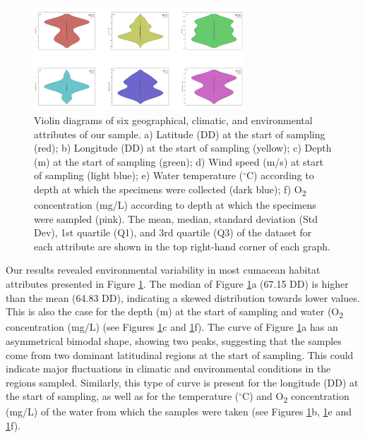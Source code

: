 \begin{figure}[htbp]
    \centering
    \includegraphics[width=0.7\textwidth]{figure1.jpg}
    \caption{Violin diagrams of six geographical, climatic, and environmental attributes of our sample. a) Latitude (DD) at the start of sampling (red); b) Longitude (DD) at the start of sampling (yellow); c) Depth (m) at the start of sampling (green); d) Wind speed (m/s) at start of sampling (light blue); e) Water temperature ($^\circ$C) according to depth at which the specimens were collected (dark blue); f) O\textsubscript{2} concentration (mg/L) according to depth at which the specimens were sampled (pink). The mean, median, standard deviation (Std Dev), 1st quartile (Q1), and 3rd quartile (Q3) of the dataset for each attribute are shown in the top right-hand corner of each graph. \label{fig:fig1}}
\end{figure}

Our results revealed environmental variability in most cumacean habitat attributes presented in Figure \ref{fig:fig1}. The median of Figure \ref{fig:fig1}a (67.15 DD) is higher than the mean (64.83 DD), indicating a skewed distribution towards lower values. This is also the case for the depth (m) at the start of sampling and water (O\textsubscript{2} concentration (mg/L) (see Figures \ref{fig:fig1}c and \ref{fig:fig1}f). The curve of Figure \ref{fig:fig1}a has an asymmetrical bimodal shape, showing two peaks, suggesting that the samples come from two dominant latitudinal regions at the start of sampling. This could indicate major fluctuations in climatic and environmental conditions in the regions sampled. Similarly, this type of curve is present for the longitude (DD) at the start of sampling, as well as for the temperature ($^\circ$C) and O\textsubscript{2} concentration (mg/L) of the water from which the samples were taken (see Figures \ref{fig:fig1}b, \ref{fig:fig1}e and \ref{fig:fig1}f). 


